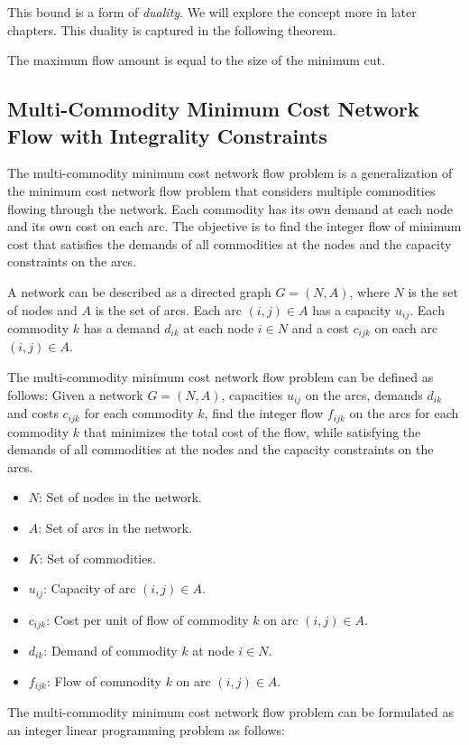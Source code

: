 This bound is a form of \emph{duality}.  We will explore the concept more in later chapters.  This duality is captured in the following theorem.

\begin{theorem}{}
The maximum flow amount is equal to the size of the minimum cut.
\end{theorem}

%
%
\subsection{Multi-Commodity Minimum Cost Network Flow with Integrality Constraints}
\label{sec:multicommodity-flow}

The multi-commodity minimum cost network flow problem is a generalization of the minimum cost network flow problem that considers multiple commodities flowing through the network. Each commodity has its own demand at each node and its own cost on each arc. The objective is to find the integer flow of minimum cost that satisfies the demands of all commodities at the nodes and the capacity constraints on the arcs.

A network can be described as a directed graph \( G = (N, A) \), where \( N \) is the set of nodes and \( A \) is the set of arcs. Each arc \( (i, j) \in A \) has a capacity \( u_{ij} \). Each commodity \( k \) has a demand \( d_{ik} \) at each node \( i \in N \) and a cost \( c_{ijk} \) on each arc \( (i, j) \in A \).

The multi-commodity minimum cost network flow problem can be defined as follows: Given a network \( G = (N, A) \), capacities \( u_{ij} \) on the arcs, demands \( d_{ik} \) and costs \( c_{ijk} \) for each commodity \( k \), find the integer flow \( f_{ijk} \) on the arcs for each commodity \( k \) that minimizes the total cost of the flow, while satisfying the demands of all commodities at the nodes and the capacity constraints on the arcs.

\begin{itemize}
\item \( N \): Set of nodes in the network.
\item \( A \): Set of arcs in the network.
\item \( K \): Set of commodities.
\end{itemize}
%
\begin{itemize}
\item \( u_{ij} \): Capacity of arc \( (i, j) \in A \).
\item \( c_{ijk} \): Cost per unit of flow of commodity \( k \) on arc \( (i, j) \in A \).
\item \( d_{ik} \): Demand of commodity \( k \) at node \( i \in N \).
\end{itemize}
%
\begin{itemize}
\item \( f_{ijk} \): Flow of commodity \( k \) on arc \( (i, j) \in A \).
\end{itemize}
%
The multi-commodity minimum cost network flow problem can be formulated as an integer linear programming problem as follows:

